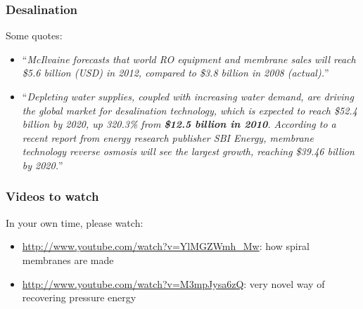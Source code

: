 \begin{frame}\frametitle{Desalination}
	Some quotes:
	\begin{itemize}
		\item	``\emph{McIlvaine forecasts that world RO equipment and membrane sales will reach \$5.6 billion (USD) in 2012, compared to \$3.8 billion in 2008 (actual).}''
		\item	``\emph{Depleting water supplies, coupled with increasing water demand, are driving the global market for desalination technology, which is expected to reach \$52.4 billion by 2020, up 320.3\% from \textbf{\$12.5 billion in 2010}. According to a recent report from energy research publisher SBI Energy, membrane technology reverse osmosis will see the largest growth, reaching \$39.46 billion by 2020.}''
	\end{itemize}	
\end{frame}

\begin{frame}\frametitle{Videos to watch}
	In your own time, please watch:
	
	\begin{itemize}
		\item	\href{http://www.youtube.com/watch?v=YlMGZWmh\_Mw}{http://www.youtube.com/watch?v=YlMGZWmh\_Mw}: how spiral membranes are made
		\item	\href{http://www.youtube.com/watch?v=M3mpJysa6zQ}{http://www.youtube.com/watch?v=M3mpJysa6zQ}: very novel way of recovering pressure energy
	\end{itemize}
\end{frame}



% 	
% 
% 
% 

